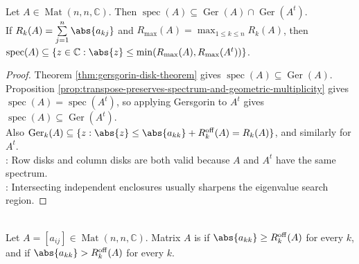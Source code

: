 \begin{corollary} \label{cor:gersgorin-row-column-refinement} \\
Let $A\in\operatorname{Mat}(n,n,\mathbb{C})$. Then $\operatorname{spec}(A)\subseteq \operatorname{Ger}(A)\cap \operatorname{Ger}(A^t)$.\\
If $R_k(A)=\sum\limits_{j=1}^{n}\abs{a_{kj}}$ and $R_{\max}(A)=\max_{1\leq k\leq n}R_k(A)$, then $\operatorname{spec}(A)\subseteq\{z\in\mathbb{C}:\abs{z}\leq \min(R_{\max}(A),R_{\max}(A^t))\}$.
\begin{proof}
Theorem \ref{thm:gersgorin-disk-theorem} gives $\operatorname{spec}(A)\subseteq \operatorname{Ger}(A)$.\\
Proposition \ref{prop:transpose-preserves-spectrum-and-geometric-multiplicity} gives $\operatorname{spec}(A)=\operatorname{spec}(A^t)$, so applying Gersgorin to $A^t$ gives $\operatorname{spec}(A)\subseteq \operatorname{Ger}(A^t)$.\\
Also $\operatorname{Ger}_k(A)\subseteq\{z:\abs{z}\leq \abs{a_{kk}}+R_k^{\mathrm{off}}(A)=R_k(A)\}$, and similarly for $A^t$.\\
: Row disks and column disks are both valid because $A$ and $A^t$ have the same spectrum.\\
: Intersecting independent enclosures usually sharpens the eigenvalue search region.
\end{proof}
\end{corollary}

\begin{definition} \label{def:diagonal-dominance} \\
Let $A=[a_{ij}]\in\operatorname{Mat}(n,n,\mathbb{C})$. Matrix $A$ is  if $\abs{a_{kk}}\geq R_k^{\mathrm{off}}(A)$ for every $k$, and  if $\abs{a_{kk}}>R_k^{\mathrm{off}}(A)$ for every $k$.
\end{definition}

